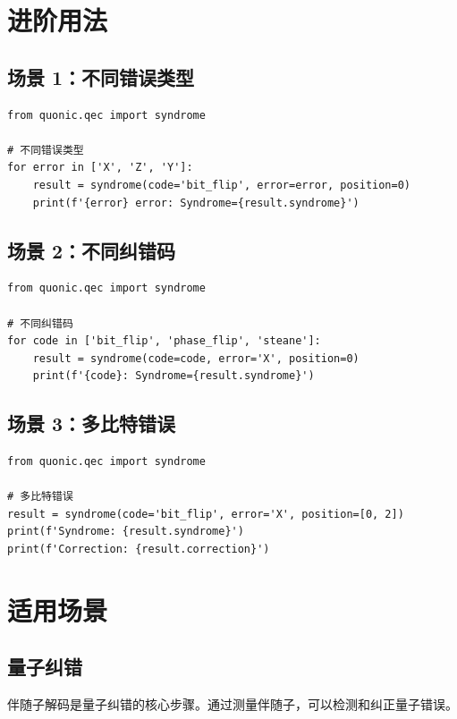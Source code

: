 \documentclass[12pt,a4paper]{article}
\begin{document}
\section{进阶用法}

\subsection{场景 1：不同错误类型}

\begin{verbatim}
from quonic.qec import syndrome

# 不同错误类型
for error in ['X', 'Z', 'Y']:
    result = syndrome(code='bit_flip', error=error, position=0)
    print(f'{error} error: Syndrome={result.syndrome}')
\end{verbatim}

\subsection{场景 2：不同纠错码}

\begin{verbatim}
from quonic.qec import syndrome

# 不同纠错码
for code in ['bit_flip', 'phase_flip', 'steane']:
    result = syndrome(code=code, error='X', position=0)
    print(f'{code}: Syndrome={result.syndrome}')
\end{verbatim}

\subsection{场景 3：多比特错误}

\begin{verbatim}
from quonic.qec import syndrome

# 多比特错误
result = syndrome(code='bit_flip', error='X', position=[0, 2])
print(f'Syndrome: {result.syndrome}')
print(f'Correction: {result.correction}')
\end{verbatim}

\section{适用场景}

\subsection{量子纠错}

伴随子解码是量子纠错的核心步骤。通过测量伴随子，可以检测和纠正量子错误。
\end{document}
